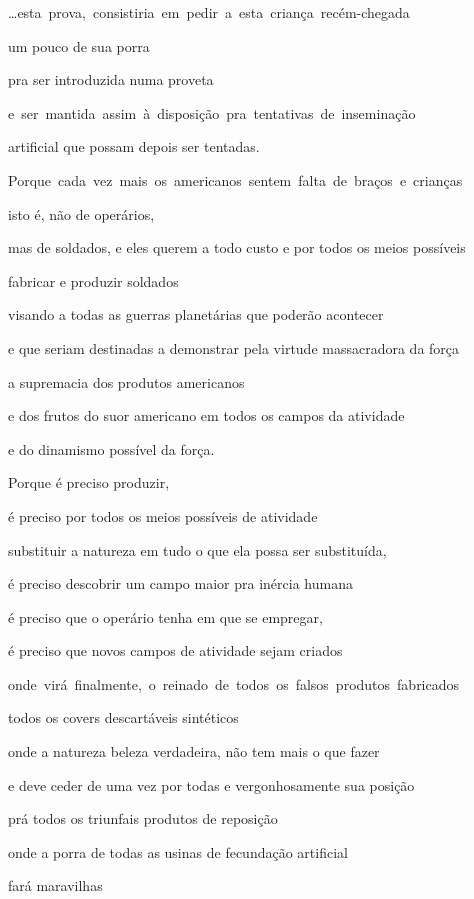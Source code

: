 \mbox{\ldots{}esta prova, consistiria em pedir a esta criança recém-chegada}

um pouco de sua porra

pra ser introduzida numa proveta

\mbox{e ser mantida assim à disposição pra tentativas de inseminação}

artificial que possam depois ser tentadas.


\mbox{Porque cada vez mais os americanos sentem falta de braços e crianças}

isto é, não de operários, 

mas de soldados, e eles querem a todo custo e por todos os meios
possíveis

fabricar e produzir soldados

visando a todas as guerras planetárias que poderão acontecer

e que seriam destinadas a demonstrar pela virtude massacradora da força

a supremacia dos produtos americanos

e dos frutos do suor americano em todos os campos da atividade

e do dinamismo possível da força.

Porque é preciso produzir, 

é preciso por todos os meios possíveis de atividade

substituir a natureza em tudo o que ela possa ser substituída,

é preciso descobrir um campo maior pra inércia humana

é preciso que o operário tenha em que se empregar,

é preciso que novos campos de atividade sejam criados

\mbox{onde virá finalmente, o reinado de todos os falsos produtos fabricados}

todos os covers descartáveis sintéticos

onde a natureza beleza verdadeira, não tem mais o que fazer

e deve ceder de uma vez por todas e vergonhosamente sua posição

prá todos os triunfais produtos de reposição

onde a porra de todas as usinas de fecundação artificial

fará maravilhas

